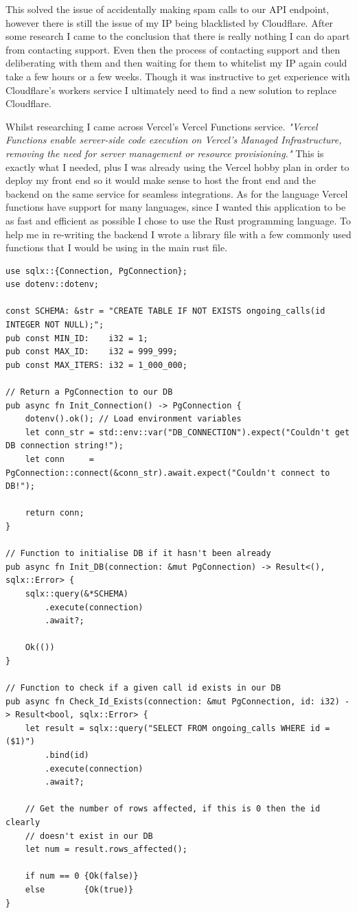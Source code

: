 This solved the issue of accidentally making spam calls to
our API endpoint, however there is still the issue of my IP
being blacklisted by Cloudflare. After some research I came
to the conclusion that there is really nothing I can do
apart from contacting support. Even then the process of
contacting support and then deliberating with them and then
waiting for them to whitelist my IP again could take a few
hours or a few weeks. Though it was instructive to get
experience with Cloudflare's workers service I ultimately
need to find a new solution to replace Cloudflare. \\
\vspace{0.2cm}

Whilst researching I came across Vercel's Vercel Functions
service. \textit{"Vercel Functions enable server-side code
execution on Vercel's Managed Infrastructure, removing
the need for server management or resource provisioning."}
This is exactly what I needed, plus I was already using the
Vercel hobby plan in order to deploy my front end so it
would make sense to host the front end and the backend on the
same service for seamless integrations. As for the language
Vercel functions have support for many languages, since I
wanted this application to be as fast and efficient as
possible I chose to use the Rust programming language. To
help me in re-writing the backend I wrote a library file with
a few commonly used functions that I would be using in the
main rust file.

\begin{verbatim}
use sqlx::{Connection, PgConnection};
use dotenv::dotenv;

const SCHEMA: &str = "CREATE TABLE IF NOT EXISTS ongoing_calls(id INTEGER NOT NULL);";
pub const MIN_ID:    i32 = 1;
pub const MAX_ID:    i32 = 999_999;
pub const MAX_ITERS: i32 = 1_000_000;

// Return a PgConnection to our DB
pub async fn Init_Connection() -> PgConnection {
    dotenv().ok(); // Load environment variables
    let conn_str = std::env::var("DB_CONNECTION").expect("Couldn't get DB connection string!");
    let conn     = PgConnection::connect(&conn_str).await.expect("Couldn't connect to DB!");

    return conn;
}

// Function to initialise DB if it hasn't been already
pub async fn Init_DB(connection: &mut PgConnection) -> Result<(), sqlx::Error> {
    sqlx::query(&*SCHEMA)
        .execute(connection)
        .await?;

    Ok(())
}

// Function to check if a given call id exists in our DB
pub async fn Check_Id_Exists(connection: &mut PgConnection, id: i32) -> Result<bool, sqlx::Error> {
    let result = sqlx::query("SELECT FROM ongoing_calls WHERE id = ($1)")
        .bind(id)
        .execute(connection)
        .await?;

    // Get the number of rows affected, if this is 0 then the id clearly
    // doesn't exist in our DB
    let num = result.rows_affected();

    if num == 0 {Ok(false)}
    else        {Ok(true)}
}
\end{verbatim}

